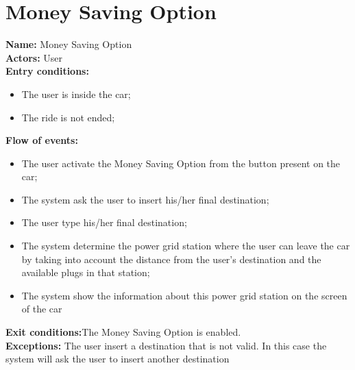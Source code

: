 \section*{Money Saving Option}
\textbf{Name:} Money Saving Option\\
\textbf{Actors:} User\\
\textbf{Entry conditions:}
\begin{itemize}
\item The user is inside the car;
\item The ride is not ended;
\end{itemize}
\textbf{Flow of events:}
\begin{itemize}
\item The user activate the Money Saving Option from the button present on the car;
\item The system ask the user to insert his/her final destination;
\item The user type his/her final destination;
\item The system determine the power grid station where the user can leave the car by taking into account the distance from the user's destination and the available plugs in that station;
\item The system show the information about this power grid station on the screen of the car
\end{itemize}
\textbf{Exit conditions:}The Money Saving Option is enabled.\\
\textbf{Exceptions:} 
The user insert a destination that is not valid. In this case the system will ask the user to insert another destination\\














 





